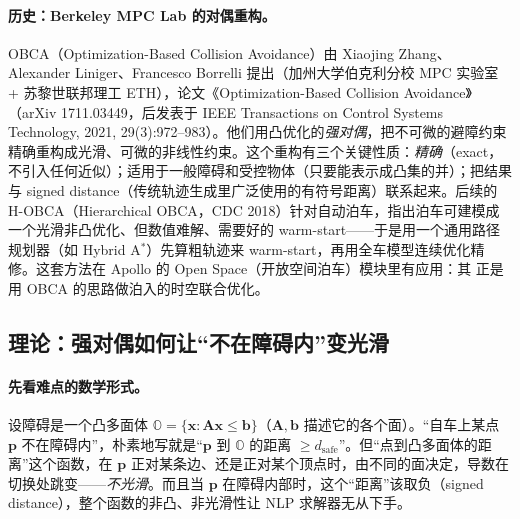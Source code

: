 \paragraph{历史：Berkeley MPC Lab 的对偶重构。}
OBCA（Optimization-Based Collision Avoidance）由 Xiaojing Zhang、Alexander Liniger、Francesco Borrelli 提出（加州大学伯克利分校 MPC 实验室 + 苏黎世联邦理工 ETH），论文《Optimization-Based Collision Avoidance》（arXiv 1711.03449，后发表于 IEEE Transactions on Control Systems Technology, 2021, 29(3):972--983）\cite{zhang2021obca}。他们用凸优化的\emph{强对偶}，把不可微的避障约束精确重构成光滑、可微的非线性约束。这个重构有三个关键性质：\emph{精确}（exact，不引入任何近似）；适用于一般障碍和受控物体（只要能表示成凸集的并）；把结果与 signed distance（传统轨迹生成里广泛使用的有符号距离）联系起来。后续的 H-OBCA（Hierarchical OBCA，CDC 2018）针对自动泊车，指出泊车可建模成一个光滑非凸优化、但数值难解、需要好的 warm-start——于是用一个通用路径规划器（如 Hybrid A$^*$）先算粗轨迹来 warm-start，再用全车模型连续优化精修\cite{zhang2018hobca}。这套方法在 Apollo 的 Open Space（开放空间泊车）模块里有应用：其 \verb@DistanceApproachProblem@ 正是用 OBCA 的思路做泊入的时空联合优化。

\subsection{理论：强对偶如何让“不在障碍内”变光滑}
\label{sec:st-obca-theory}

\paragraph{先看难点的数学形式。}
设障碍是一个凸多面体 $\mathbb O=\{\mathbf x:\mathbf A\mathbf x\le\mathbf b\}$（$\mathbf A,\mathbf b$ 描述它的各个面）。“自车上某点 $\mathbf p$ 不在障碍内”，朴素地写就是“$\mathbf p$ 到 $\mathbb O$ 的距离 $\ge d_{\text{safe}}$”。但“点到凸多面体的距离”这个函数，在 $\mathbf p$ 正对某条边、还是正对某个顶点时，由不同的面决定，导数在切换处跳变——\emph{不光滑}。而且当 $\mathbf p$ 在障碍内部时，这个“距离”该取负（signed distance），整个函数的非凸、非光滑性让 NLP 求解器无从下手。

